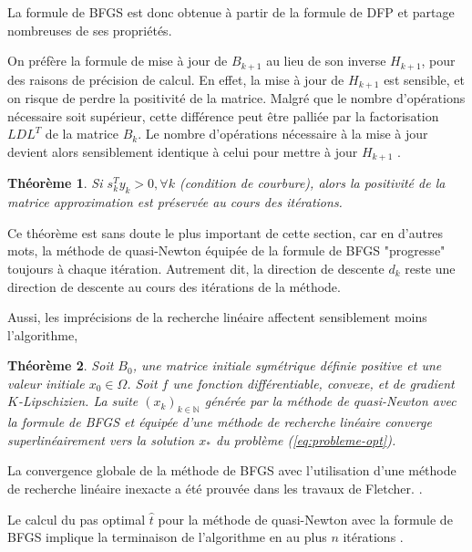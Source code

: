 \documentclass[3p, twocolumn]{elsarticle}
\newtheorem{thm}{Théorème}
\begin{document}
La formule de BFGS est donc obtenue à partir de la formule de DFP et partage nombreuses de ses propriétés.
\begin{rmk}
    On préfère la formule de mise à jour de $B_{k+1}$ au lieu de son inverse $H_{k+1}$, pour des raisons de précision de calcul. En effet, la mise à jour de $H_{k+1}$ est sensible, et on risque de perdre la positivité de la matrice. Malgré que le nombre d'opérations nécessaire soit supérieur, cette différence peut être palliée par la factorisation $LDL^T$ de la matrice $B_{k}$. Le nombre d'opérations nécessaire à la mise à jour devient alors sensiblement identique à celui pour mettre à jour $H_{k+1}$ \cite{book:GillMurrayWright1981}.
\end{rmk}

\begin{thm}
    Si $s_k^Ty_k > 0, \forall k$ (condition de courbure), alors la positivité de la matrice approximation est préservée au cours des itérations.
\end{thm}

Ce théorème est sans doute le plus important de cette section, car en d'autres mots, la méthode de quasi-Newton équipée de la formule de BFGS "progresse" toujours à chaque itération. Autrement dit, la direction de descente $d_k$ reste une direction de descente au cours des itérations de la méthode.

Aussi, les imprécisions de la recherche linéaire affectent sensiblement moins l'algorithme,

\begin{thm}
    Soit $B_0$, une matrice initiale symétrique définie positive et une valeur initiale $x_0\in\Omega$. Soit $f$ une fonction différentiable, convexe, et de gradient $K$-Lipschizien. La suite $(x_k)_{k\in \mathbb{N}}$ générée par la méthode de quasi-Newton avec la formule de BFGS et équipée d'une méthode de recherche linéaire converge superlinéairement vers la solution $x_*$ du problème (\ref{eq:probleme-opt}).
\end{thm}
\begin{pf}
    La convergence globale de la méthode de BFGS avec l'utilisation d'une méthode de recherche linéaire inexacte a été prouvée dans les travaux de Fletcher. \cite{book:Fletcher_1987}.
\end{pf}

\begin{rmk}
    Le calcul du pas optimal $\hat t$ pour la méthode de quasi-Newton avec la formule de BFGS implique la terminaison de l'algorithme en au plus $n$ itérations \cite{book:Fletcher_1987}.
\end{rmk}
\end{document}
